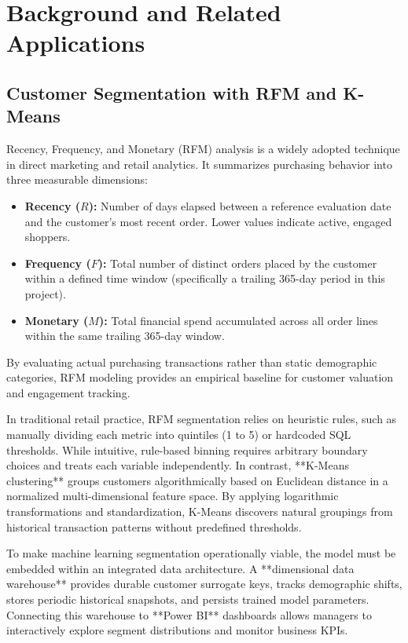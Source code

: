 \chapter{Background and Related Applications}
\label{chap:background}

\section{Customer Segmentation with RFM and K-Means}
Recency, Frequency, and Monetary (RFM) analysis is a widely adopted technique in direct marketing and retail analytics. It summarizes purchasing behavior into three measurable dimensions:
\begin{itemize}
    \item \textbf{Recency ($R$):} Number of days elapsed between a reference evaluation date and the customer's most recent order. Lower values indicate active, engaged shoppers.
    \item \textbf{Frequency ($F$):} Total number of distinct orders placed by the customer within a defined time window (specifically a trailing 365-day period in this project).
    \item \textbf{Monetary ($M$):} Total financial spend accumulated across all order lines within the same trailing 365-day window.
\end{itemize}
By evaluating actual purchasing transactions rather than static demographic categories, RFM modeling provides an empirical baseline for customer valuation and engagement tracking.

In traditional retail practice, RFM segmentation relies on heuristic rules, such as manually dividing each metric into quintiles (1 to 5) or hardcoded SQL thresholds. While intuitive, rule-based binning requires arbitrary boundary choices and treats each variable independently. In contrast, **K-Means clustering** groups customers algorithmically based on Euclidean distance in a normalized multi-dimensional feature space. By applying logarithmic transformations and standardization, K-Means discovers natural groupings from historical transaction patterns without predefined thresholds.

To make machine learning segmentation operationally viable, the model must be embedded within an integrated data architecture. A **dimensional data warehouse** provides durable customer surrogate keys, tracks demographic shifts, stores periodic historical snapshots, and persists trained model parameters. Connecting this warehouse to **Power BI** dashboards allows managers to interactively explore segment distributions and monitor business KPIs.

